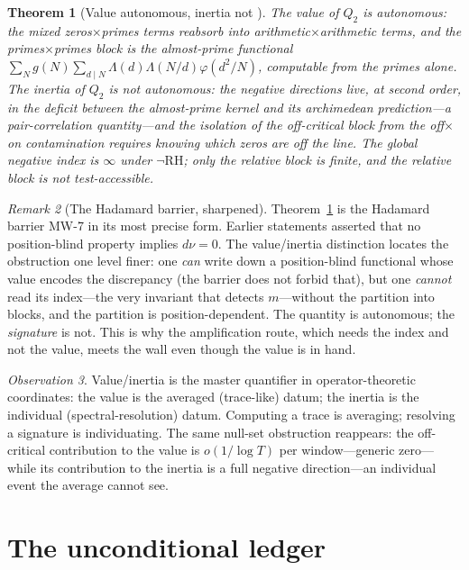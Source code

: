 \documentclass[11pt]{amsart}
\newtheorem{theorem}{Theorem}[section]
\theoremstyle{definition}
\theoremstyle{remark}
\newtheorem{remark}[theorem]{Remark}
\newtheorem{observation}[theorem]{Observation}
\newcommand{\RH}{\mathrm{RH}}
\newcommand{\dnu}{d\nu}
\newcommand{\La}{\Lambda}
\begin{document}
\begin{theorem}[Value autonomous, inertia not {\cite[--108]{P40}}]
\label{thm:autonomy}
The value of $Q_2$ is autonomous: the mixed zeros$\times$primes terms
reabsorb into arithmetic$\times$arithmetic terms, and the primes$\times$primes
block is the almost-prime functional
$\sum_N g(N)\sum_{d\mid N}\La(d)\La(N/d)\varphi(d^2/N)$, computable from the
primes alone. The inertia of $Q_2$ is \emph{not} autonomous: the negative
directions live, at second order, in the deficit between the almost-prime
kernel and its archimedean prediction---a pair-correlation quantity---and the
isolation of the off-critical block from the off$\times$on contamination
requires knowing which zeros are off the line. The global negative index is
$\infty$ under $\neg\RH$; only the relative block is finite, and the relative
block is not test-accessible.
\end{theorem}

\begin{remark}[The Hadamard barrier, sharpened]
Theorem~\ref{thm:autonomy} is the Hadamard barrier MW-7 in its most precise
form. Earlier statements asserted that no position-blind property implies
$\dnu=0$. The value/inertia distinction locates the obstruction one level
finer: one \emph{can} write down a position-blind functional whose value
encodes the discrepancy (the barrier does not forbid that), but one
\emph{cannot} read its index---the very invariant that detects $m$---without
the partition into blocks, and the partition is position-dependent. The
quantity is autonomous; the \emph{signature} is not. This is why the
amplification route, which needs the index and not the value, meets the wall
even though the value is in hand.
\end{remark}

\begin{observation}
Value/inertia is the master quantifier in operator-theoretic coordinates: the
value is the averaged (trace-like) datum; the inertia is the individual
(spectral-resolution) datum. Computing a trace is averaging; resolving a
signature is individuating. The same null-set obstruction reappears: the
off-critical contribution to the value is $o(1/\log T)$ per window---generic
zero---while its contribution to the inertia is a full negative direction---an
individual event the average cannot see.
\end{observation}

\section{The unconditional ledger}\label{sec:ledger}
\end{document}

